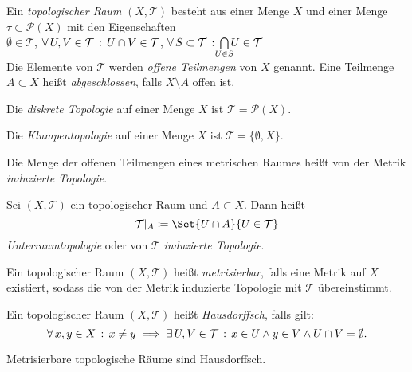 \documentclass{cheat-sheet}
\newcommand{\Tau}{\mathcal{T}} %
\newcommand{\inlineitem}[1]{\textbullet \enspace #1} %
\begin{document}
\begin{defn}
  Ein \emph{topologischer Raum} $(X, \Tau)$ besteht aus einer Menge $X$ und einer Menge $\tau \subset \mathcal{P}(X)$ mit den Eigenschaften \\
  \inlineitem{$\emptyset \in \Tau$,} \quad
  \inlineitem{$\fa{U, V \in \Tau} U \cap V \in \Tau$,} \quad
  \inlineitem{$\fa{S \subset \Tau} \bigcap_{\mathclap{U \in S}} U \in \Tau$} \\
  Die Elemente von $\Tau$ werden \emph{offene Teilmengen} von $X$ genannt. Eine Teilmenge $A \subset X$ heißt \emph{abgeschlossen}, falls $X \setminus A$ offen ist.
\end{defn}

\begin{bsp}
  Die \emph{diskrete Topologie} auf einer Menge $X$ ist $\Tau = \mathcal{P}(X)$.
\end{bsp}

\begin{bsp}
  Die \emph{Klumpentopologie} auf einer Menge $X$ ist $\Tau = \{ \emptyset, X \}$.
\end{bsp}

\begin{defn}
  Die Menge der offenen Teilmengen eines metrischen Raumes heißt von der Metrik \emph{induzierte Topologie}.
\end{defn}

\begin{defn}
  Sei $(X, \Tau)$ ein topologischer Raum und $A \subset X$. Dann heißt
  \[ \Tau|_A \coloneqq \Set{U \cap A}{U \in \Tau} \]
  \emph{Unterraumtopologie} oder von $\Tau$ \emph{induzierte Topologie}.
\end{defn}


\begin{defn}
  Ein topologischer Raum $(X, \Tau)$ heißt \emph{metrisierbar}, falls eine Metrik auf $X$ existiert, sodass die von der Metrik induzierte Topologie mit $\Tau$ übereinstimmt.
\end{defn}

\begin{defn}
  Ein topologischer Raum $(X, \Tau)$ heißt \emph{Hausdorffsch}, falls gilt:
  \[ \fa{x,y \in X} x \not= y \implies \ex{U,V \in \Tau} x \in U \wedge y \in V \wedge U \cap V = \emptyset. \]
\end{defn}

\begin{prop}
  Metrisierbare topologische Räume sind Hausdorffsch.
\end{prop}
\end{document}
